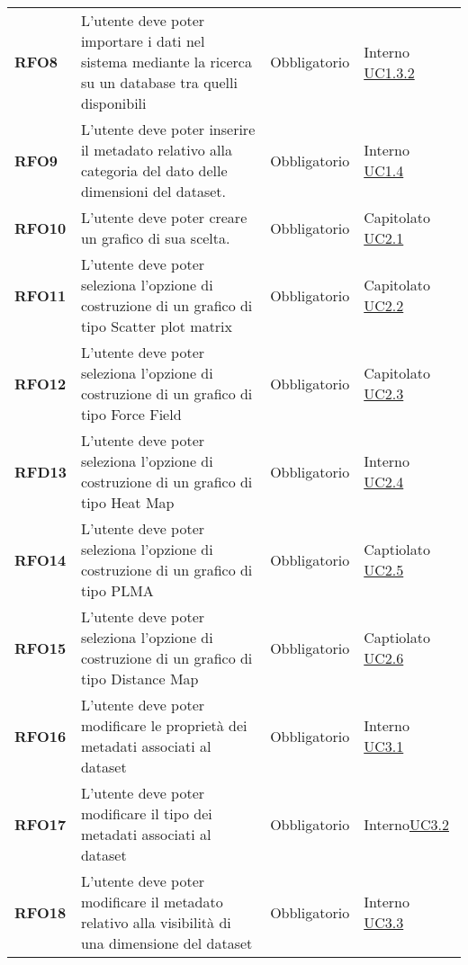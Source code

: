 \begin{longtable}[H]{>{\centering\bfseries}m{2cm} >{\centering}m{9cm} >{\centering}m{2.5cm} >{\centering\arraybackslash}m{2.5cm}}
    RFO8
    &   L'utente deve poter importare i dati nel sistema mediante la ricerca
        su un database tra quelli disponibili
    & Obbligatorio
    & Interno \hyperref[par:uc1.3.2]{UC1.3.2}\\

    RFO9
    &   L'utente deve poter inserire il metadato relativo alla categoria
        del dato delle dimensioni del dataset.
    & Obbligatorio
    & Interno \hyperref[ssub:uc1.4]{UC1.4}\\

    RFO10
    & L'utente deve poter creare un grafico di sua scelta.
    & Obbligatorio
    & Capitolato \hyperref[ssub:uc2.1]{UC2.1}\\

    RFO11
    & L'utente deve poter seleziona l'opzione di costruzione di un grafico di tipo Scatter plot matrix
    & Obbligatorio
    & Capitolato   \hyperref[ssub:uc2.2]{UC2.2}\\

    RFO12
    & L'utente deve poter seleziona l'opzione di costruzione di un grafico di tipo Force Field
    & Obbligatorio
    & Capitolato  \hyperref[ssub:uc2.3]{UC2.3}\\
    
    RFD13
    & L'utente deve poter seleziona l'opzione di costruzione di un grafico di tipo Heat Map
    & Obbligatorio
    & Interno  \hyperref[ssub:uc2.4]{UC2.4}\\

    RFO14
    & L'utente deve poter seleziona l'opzione di costruzione di un grafico di tipo PLMA
    & Obbligatorio
    & Captiolato   \hyperref[ssub:uc2.5]{UC2.5}\\

    RFO15
    & L'utente deve poter seleziona l'opzione di costruzione di un grafico di tipo Distance Map
    & Obbligatorio
    & Captiolato  \hyperref[ssub:UC2.6]{UC2.6}\\

    RFO16
    & L'utente deve poter modificare le proprietà dei metadati associati al dataset
    & Obbligatorio
    & Interno  \hyperref[ssub:uc3.1]{UC3.1} \\

    RFO17
    & L'utente deve poter modificare il tipo dei metadati associati al dataset
    & Obbligatorio
    & Interno\hyperref[sub:uc3.2]{UC3.2} \\

    RFO18
    & L'utente deve poter modificare il metadato relativo alla visibilità di una dimensione del dataset
    & Obbligatorio
    & Interno  \hyperref[sub:uc3.3]{UC3.3} \\


\end{longtable}
